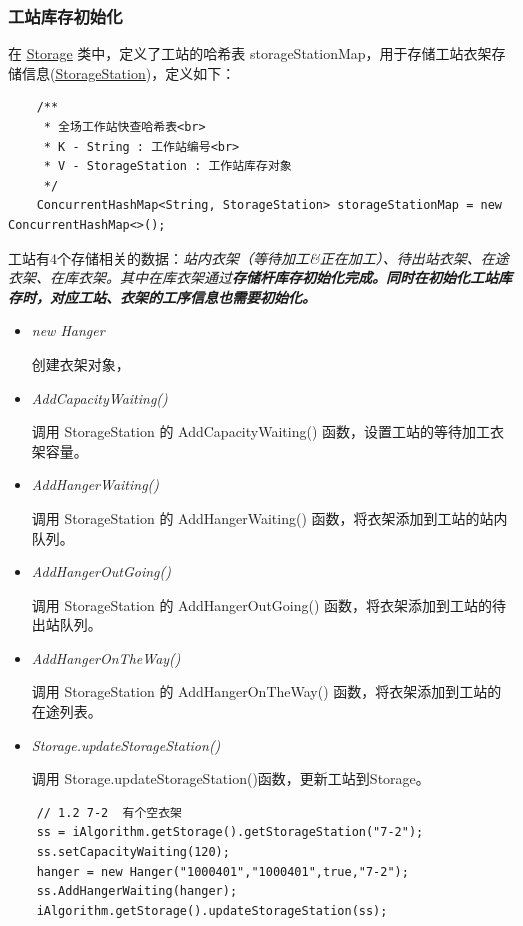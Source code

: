 \subsubsection{工站库存初始化}
在 \hyperref[sec:param-storage]{\underline{Storage}} 类中，定义了工站的哈希表 storageStationMap，用于存储工站衣架存储信息(\hyperref[sec:param-storageStation]{\underline{StorageStation}})，定义如下：
\begin{lstlisting}
    /**
     * 全场工作站快查哈希表<br>
     * K - String : 工作站编号<br>
     * V - StorageStation : 工作站库存对象
     */
    ConcurrentHashMap<String, StorageStation> storageStationMap = new ConcurrentHashMap<>();
\end{lstlisting}\vspace{-30pt}
工站有4个存储相关的数据：\it{站内衣架（等待加工\&正在加工）}、\it{待出站衣架}、\it{在途衣架}、\it{在库衣架}。其中在库衣架通过\bf{存储杆库存初始化}完成。同时在初始化工站库存时，对应工站、衣架的工序信息也需要初始化。
\begin{itemize}
    \item \hypertarget{1}{\it{new Hanger}}
    创建衣架对象，
    \item \hypertarget{2}{\it{AddCapacityWaiting()}}
    调用 StorageStation 的  AddCapacityWaiting() 函数，设置工站的等待加工衣架容量。
    \item \hypertarget{3}{\it{AddHangerWaiting()}}
    调用 StorageStation 的  AddHangerWaiting() 函数，将衣架添加到工站的站内队列。
    \item \hypertarget{3}{\it{AddHangerOutGoing()}}
    调用 StorageStation 的  AddHangerOutGoing() 函数，将衣架添加到工站的待出站队列。
    \item \hypertarget{3}{\it{AddHangerOnTheWay()}}
    调用 StorageStation 的  AddHangerOnTheWay() 函数，将衣架添加到工站的在途列表。
    \item \hypertarget{4}{\it{Storage.updateStorageStation()}}
    调用 Storage.updateStorageStation()函数，更新工站到Storage。
\end{itemize}
\begin{lstlisting}
    // 1.2 7-2  有个空衣架
    ss = iAlgorithm.getStorage().getStorageStation("7-2");
    ss.setCapacityWaiting(120);
    hanger = new Hanger("1000401","1000401",true,"7-2");
    ss.AddHangerWaiting(hanger);
    iAlgorithm.getStorage().updateStorageStation(ss);
\end{lstlisting}\vspace{-30pt}


